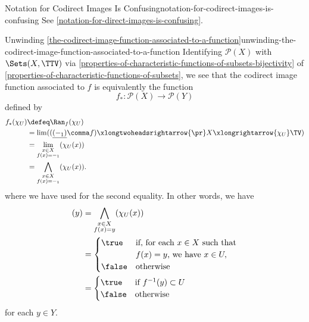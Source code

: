 \begin{warning}{Notation for Codirect Images Is Confusing}{notation-for-codirect-images-is-confusing}%
    See \cref{notation-for-direct-images-is-confusing}.
\end{warning}
\begin{remark}{Unwinding \cref{the-codirect-image-function-associated-to-a-function}}{unwinding-the-codirect-image-function-associated-to-a-function}%
    Identifying $\mathcal{P}(X)$ with $\Sets(X,\TTV)$ via \cref{properties-of-characteristic-functions-of-subsets-bijectivity} of \cref{properties-of-characteristic-functions-of-subsets}, we see that the codirect image function associated to $f$ is equivalently the function
    \[
        f_{*}%
        \colon%
        \mathcal{P}(X)%
        \to%
        \mathcal{P}(Y)%
    \]%
    defined by
    \begin{align*}
        f_{*}(\chi_{U}) &\defeq \Ran_{f}(\chi_{U})\\%
                        &=      \lim((\underline{(-_{1})}\comma f)\xlongtwoheadsrightarrow{\pr}X\xlongrightarrow{\chi_{U}}\TV)\\%
                        &=      \lim_{\substack{x\in X\\f(x)=-_{1}}}(\chi_{U}(x))\\%
                        &=      \bigwedge_{\substack{x\in X\\f(x)=-_{1}}}(\chi_{U}(x)).%
    \end{align*}
    where we have used  for the second equality. In other words, we have
    \begin{align*}
        [f_{*}(\chi_{U})](y) &= \bigwedge_{\substack{x\in X\\f(x)=y}}(\chi_{U}(x))\\%
                             &= \begin{cases}
                                    \true  &\text{if, for each $x\in X$ such that}\\
                                           &\text{$f(x)=y$, we have $x\in U,$}\\
                                    \false &\text{otherwise}
                                \end{cases}\\
                             &= \begin{cases}
                                    \true  &\text{if $f^{-1}(y)\subset U$}\\
                                    \false &\text{otherwise}
                                \end{cases}
    \end{align*}
    for each $y\in Y$.
\end{remark}
